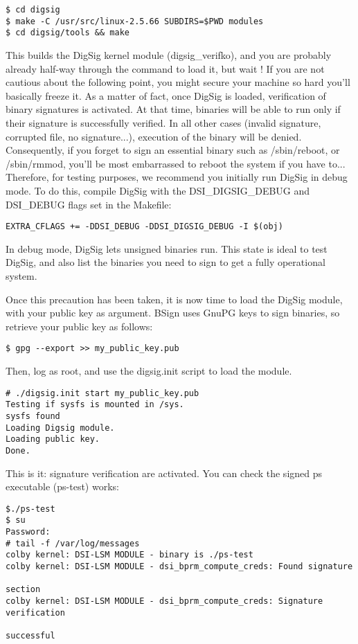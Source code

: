 \documentclass{article}
\begin{document}
\begin{verbatim} 
$ cd digsig
$ make -C /usr/src/linux-2.5.66 SUBDIRS=$PWD modules
$ cd digsig/tools && make
\end{verbatim} 

This builds the DigSig kernel module (digsig\_verifko), and you are
probably already half-way through the command to load it, but wait !
If you are not cautious about the following point, you might secure
your machine so hard you'll basically freeze it. As a matter of fact,
once DigSig is loaded, verification of binary signatures is activated.
At that time, binaries will be able to run only if their signature is
successfully verified. In all other cases (invalid signature,
corrupted file, no signature...), execution of the binary will be
denied. Consequently, if you forget to sign an essential binary such
as /sbin/reboot, or /sbin/rmmod, you'll be most embarrassed to reboot
the system if you have to...  Therefore, for testing purposes, we
recommend you initially run DigSig in debug mode. To do this, compile
DigSig with the DSI\_DIGSIG\_DEBUG and DSI\_DEBUG flags set in the
Makefile:

\begin{verbatim} 
EXTRA_CFLAGS += -DDSI_DEBUG -DDSI_DIGSIG_DEBUG -I $(obj)
\end{verbatim} 

In debug mode, DigSig lets unsigned binaries run. This state is ideal
to test DigSig, and also list the binaries you need to sign to get a
fully operational system.

Once this precaution has been taken, it is now time to load the DigSig
module, with your public key as argument. BSign uses GnuPG keys to
sign binaries, so retrieve your public key as follows:

\begin{verbatim} 
$ gpg --export >> my_public_key.pub 
\end{verbatim} 

Then, log as root, and use the digsig.init script to load the module.

\begin{verbatim} 
# ./digsig.init start my_public_key.pub
Testing if sysfs is mounted in /sys.
sysfs found
Loading Digsig module.
Loading public key.
Done.
\end{verbatim} 

This is it: signature verification are activated. You can check the 
signed ps executable (ps-test) works:

\begin{verbatim} 
$./ps-test
$ su
Password:
# tail -f /var/log/messages
colby kernel: DSI-LSM MODULE - binary is ./ps-test
colby kernel: DSI-LSM MODULE - dsi_bprm_compute_creds: Found signature 
                                                                 section
colby kernel: DSI-LSM MODULE - dsi_bprm_compute_creds: Signature verification 
                                                                 successful
\end{verbatim} 
\end{document}
